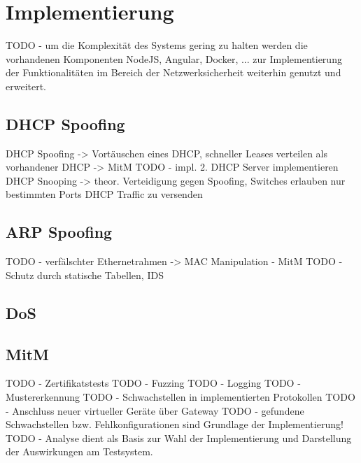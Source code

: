 \chapter{Implementierung}

TODO - um die Komplexität des Systems gering zu halten werden die vorhandenen Komponenten NodeJS, Angular, Docker, ... zur Implementierung der Funktionalitäten im Bereich der Netzwerksicherheit weiterhin genutzt und erweitert.

\section{DHCP Spoofing}
\label{Impl:DHCP Spoofing}
DHCP Spoofing -> Vortäuschen eines DHCP, schneller Leases verteilen als vorhandener DHCP -> MitM
TODO - impl. 2. DHCP Server implementieren
DHCP Snooping -> theor. Verteidigung gegen Spoofing, Switches erlauben nur bestimmten Ports DHCP Traffic zu versenden

\section{\ac{ARP} Spoofing}
TODO - verfälschter Ethernetrahmen -> MAC Manipulation - MitM
TODO - Schutz durch statische Tabellen, \ac{IDS}

\section{\ac{DoS}}

\section{\ac{MitM}}

TODO - Zertifikatstests
TODO - Fuzzing
TODO - Logging
TODO - Mustererkennung
TODO - Schwachstellen in implementierten Protokollen
TODO - Anschluss neuer virtueller Geräte über Gateway
TODO - gefundene Schwachstellen bzw. Fehlkonfigurationen sind Grundlage der Implementierung!
TODO - Analyse dient als Basis zur Wahl der Implementierung und Darstellung der Auswirkungen am Testsystem.